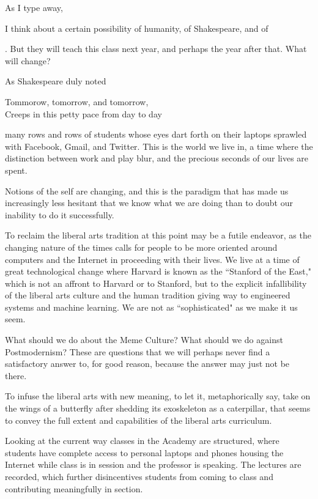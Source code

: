\documentclass[12pt,letterpaper]{article}
\begin{document}
As I type away, 



I think about a certain possibility of humanity, of Shakespeare, and of 

.  But they will teach this class next year, and perhaps the year after that.  What will change?  

As Shakespeare duly noted

Tommorow, tomorrow, and tomorrow,\\
Creeps in this petty pace from day to day

many rows and rows of students whose eyes dart forth on their laptops sprawled with Facebook, Gmail, and Twitter.  This is the world we live in, a time where the distinction between work and play blur, and the precious seconds of our lives are spent.  

Notions of the self are changing, and this is the paradigm that has made us increasingly less hesitant that we know what we are doing than to doubt our inability to do it successfully.

To reclaim the liberal arts tradition at this point may be a futile endeavor,
as the changing nature of the times calls for people to be more oriented around computers and the Internet in proceeding with their lives.  We live at a time of great technological change where Harvard is known as the ``Stanford of the East," which is not an affront to Harvard or to Stanford, but to the explicit infallibility of the liberal arts culture and the human tradition giving way to engineered systems and machine learning.  We are not as ``sophisticated" as we make it us seem.  

What should we do about the Meme Culture?  What should we do against Postmodernism?  These are questions that we will perhaps never find a satisfactory answer to, for good reason, because the answer may just not be there.

To infuse the liberal arts with new meaning, to let it, metaphorically say, take on the wings of a butterfly after shedding its exoskeleton as a caterpillar, that seems to convey the full extent and capabilities of the liberal arts curriculum.

Looking at the current way classes in the Academy are structured, where students have complete access to personal laptops and phones housing the Internet while class is in session and the professor is speaking.  The lectures are recorded, which further disincentives students from coming to class and contributing meaningfully in section.
\end{document}
